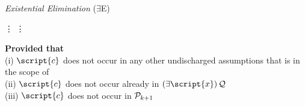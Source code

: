 \begin{multicols}{2}
\textit{Existential Elimination} ($\exists$E)

\begin{fitchproof}
	 {\hspace{2em} \vdots}
	\open	
		 
		 {\hspace{2em} \vdots}
	\close
	 
\end{fitchproof}

\textbf{Provided that} \\
(i)  $\script{c}$ does not occur in any other undischarged assumptions that  is in the scope of \\
(ii) $\script{c}$ does not occur already in $\qt{\exists}{\script{x}} \metav{Q}$ \\
(iii) $\script{c}$ does not occur in $\mathcal{P}_{k+1}$ \\


\end{multicols} %